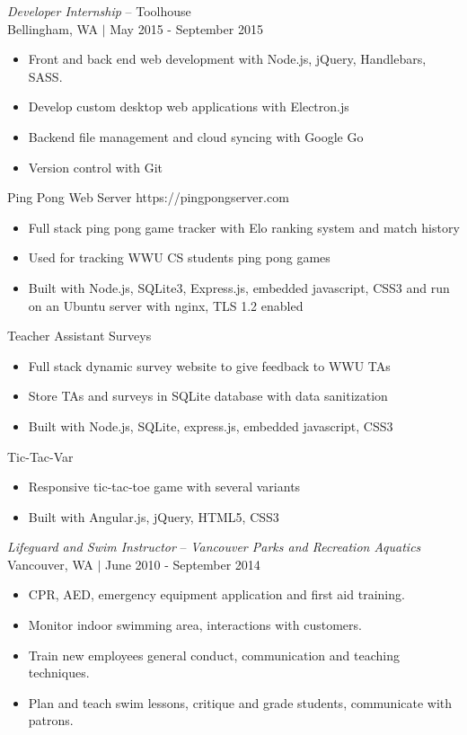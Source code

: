 \documentclass[line,margin]{res}
\begin{document}
\begin{resume}
	{\sl Developer Internship} -- {\footnotesize Toolhouse} \\
	{\footnotesize Bellingham, WA $|$  May 2015 - September 2015}
	\begin{itemize} \itemsep -2pt
		\item Front and back end web development with Node.js, jQuery, Handlebars, SASS.
		\item Develop custom desktop web applications with Electron.js
		\item Backend file management and cloud syncing with Google Go
		\item Version control with Git
	\end{itemize}
	Ping Pong Web Server {\footnotesize https://pingpongserver.com}
\begin{itemize}\itemsep -2pt
		\item Full stack ping pong game tracker with Elo ranking system and match history
		\item Used for tracking WWU CS students ping pong games
		\item Built with Node.js, SQLite3, Express.js, embedded javascript, CSS3 and run on an Ubuntu server with nginx, TLS 1.2 enabled
	\end{itemize}
	Teacher Assistant Surveys
	\begin{itemize} \itemsep -2pt
		\item Full stack dynamic survey website to give feedback to WWU TAs
		\item Store TAs and surveys in SQLite database with data sanitization
		\item Built with Node.js, SQLite, express.js, embedded javascript, CSS3
	\end{itemize}
	Tic-Tac-Var
	\begin{itemize} \itemsep -2pt
		\item Responsive tic-tac-toe game with several variants
		\item Built with Angular.js, jQuery, HTML5, CSS3
	\end{itemize}

	{\sl Lifeguard and Swim Instructor} -- {\sl Vancouver Parks and Recreation Aquatics} \\
	{\footnotesize Vancouver, WA $|$  June 2010 - September 2014}
	\begin{itemize} \itemsep -2pt
		\item CPR, AED, emergency equipment application and first aid training.
		\item Monitor indoor swimming area, interactions with customers.
		\item Train new employees general conduct, communication and teaching techniques.
		\item Plan and teach swim lessons, critique and grade students, communicate with patrons.
	\end{itemize}


\end{resume}
\end{document}
